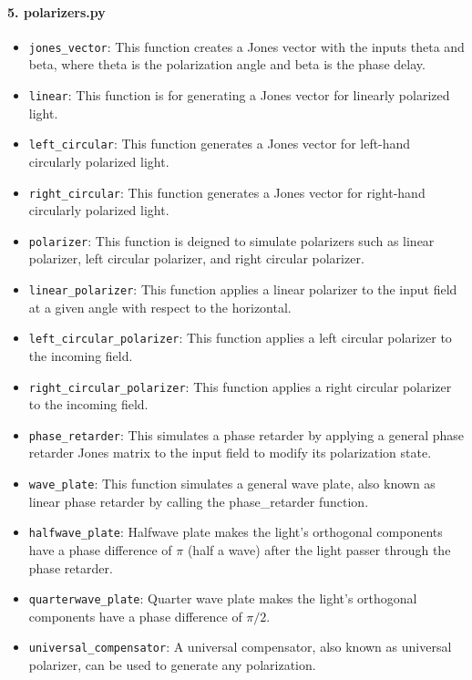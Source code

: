 \documentclass[a4paper,12pt]{report}
\begin{document}
\paragraph*{5. \textbf{polarizers.py}}
\begin{itemize}
  \item \texttt{jones\_vector}: This function creates a Jones vector with the inputs theta and beta, where theta is the polarization angle and beta is the phase delay.
  \item \texttt{linear}: This function is for generating a Jones vector for linearly polarized light.
  \item \texttt{left\_circular}: This function generates a Jones vector for left-hand circularly polarized light.
  \item \texttt{right\_circular}: This function generates a Jones vector for right-hand circularly polarized light.
  \item \texttt{polarizer}: This function is deigned to simulate polarizers such as linear polarizer, left circular polarizer, and right circular polarizer.
  \item \texttt{linear\_polarizer}: This function applies a linear polarizer to the input field at a given angle with respect to the horizontal.
  \item \texttt{left\_circular\_polarizer}: This function applies a left circular polarizer to the incoming field.
  \item \texttt{right\_circular\_polarizer}: This function applies a right circular polarizer to the incoming field.
  \item \texttt{phase\_retarder}: This simulates a phase retarder by applying a general phase retarder Jones matrix to the input field to modify its polarization state.
  \item \texttt{wave\_plate}: This function simulates a general wave plate, also known as linear phase retarder by calling the phase\_retarder function.
  \item \texttt{halfwave\_plate}: Halfwave plate makes the light's orthogonal components have a phase difference of $\pi$ (half a wave) after the light passer through the phase retarder.
  \item \texttt{quarterwave\_plate}: Quarter wave plate makes the light's orthogonal components have a phase difference of $\pi/2$.
  \item \texttt{universal\_compensator}: A universal compensator, also known as universal polarizer, can be used to generate any polarization.
\end{itemize}
\end{document}
